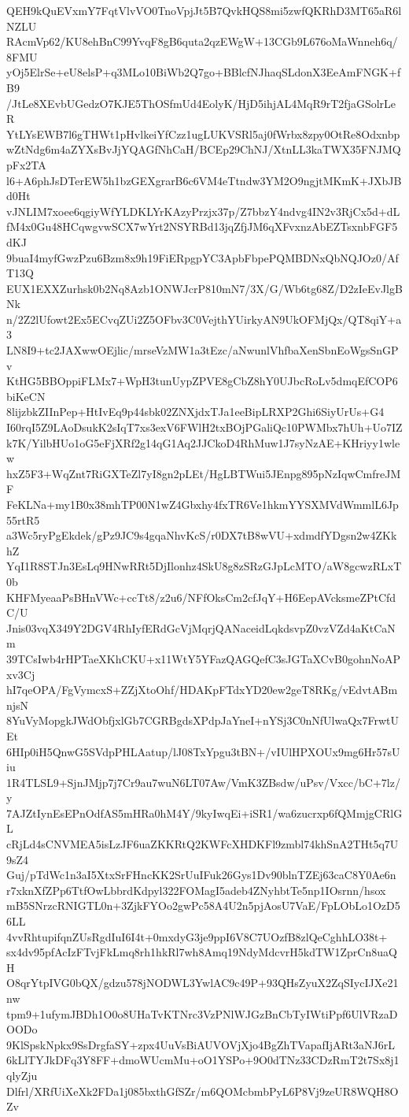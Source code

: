 QEH9kQuEVxmY7FqtVlvVO0TnoVpjJt5B7QvkHQS8mi5zwfQKRhD3MT65aR6lNZLU
RAcmVp62/KU8ehBnC99YvqF8gB6quta2qzEWgW+13CGb9L676oMaWnneh6q/8FMU
yOj5ElrSe+eU8elsP+q3MLo10BiWb2Q7go+BBlcfNJhaqSLdonX3EeAmFNGK+fB9
/JtLe8XEvbUGedzO7KJE5ThOSfmUd4EolyK/HjD5ihjAL4MqR9rT2fjaGSolrLeR
YtLYsEWB7l6gTHWt1pHvlkeiYfCzz1ugLUKVSRl5aj0fWrbx8zpy0OtRe8Odxnbp
wZtNdg6m4aZYXsBvJjYQAGfNhCaH/BCEp29ChNJ/XtnLL3kaTWX35FNJMQpFx2TA
l6+A6phJsDTerEW5h1bzGEXgrarB6c6VM4eTtndw3YM2O9ngjtMKmK+JXbJBd0Ht
vJNLIM7xoee6qgiyWfYLDKLYrKAzyPrzjx37p/Z7bbzY4ndvg4IN2v3RjCx5d+dL
fM4x0Gu48HCqwgvwSCX7wYrt2NSYRBd13jqZfjJM6qXFvxnzAbEZTsxnbFGF5dKJ
9buaI4myfGwzPzu6Bzm8x9h19FiERpgpYC3ApbFbpePQMBDNxQbNQJOz0/AfT13Q
EUX1EXXZurhsk0b2Nq8Azb1ONWJcrP810mN7/3X/G/Wb6tg68Z/D2zIeEvJlgBNk
n/2Z2lUfowt2Ex5ECvqZUi2Z5OFbv3C0VejthYUirkyAN9UkOFMjQx/QT8qiY+a3
LN8I9+tc2JAXwwOEjlic/mrseVzMW1a3tEzc/aNwunlVhfbaXenSbnEoWgsSnGPv
KtHG5BBOppiFLMx7+WpH3tunUypZPVE8gCbZ8hY0UJbcRoLv5dmqEfCOP6biKeCN
8lijzbkZIInPep+HtIvEq9p44sbk02ZNXjdxTJa1eeBipLRXP2Ghi6SiyUrUs+G4
I60rqI5Z9LAoDsukK2sIqT7xs3exV6FWlH2txBOjPGaliQc10PWMbx7hUh+Uo7IZ
k7K/YilbHUo1oG5eFjXRf2g14qG1Aq2JJCkoD4RhMuw1J7syNzAE+KHriyy1wlew
hxZ5F3+WqZnt7RiGXTeZl7yI8gn2pLEt/HgLBTWui5JEnpg895pNzIqwCmfreJMF
FeKLNa+my1B0x38mhTP00N1wZ4Gbxhy4fxTR6Ve1hkmYYSXMVdWmmlL6Jp55rtR5
a3Wc5ryPgEkdek/gPz9JC9s4gqaNhvKcS/r0DX7tB8wVU+xdmdfYDgsn2w4ZKkhZ
YqI1R8STJn3EsLq9HNwRRt5DjIlonhz4SkU8g8zSRzGJpLcMTO/aW8gcwzRLxT0b
KHFMyeaaPsBHnVWc+ccTt8/z2u6/NFfOksCm2cfJqY+H6EepAVcksmeZPtCfdC/U
Jnis03vqX349Y2DGV4RhIyfERdGcVjMqrjQANaceidLqkdsvpZ0vzVZd4aKtCaNm
39TCsIwb4rHPTaeXKhCKU+x11WtY5YFazQAGQefC3sJGTaXCvB0gohnNoAPxv3Cj
hI7qeOPA/FgVymcxS+ZZjXtoOhf/HDAKpFTdxYD20ew2geT8RKg/vEdvtABmnjsN
8YuVyMopgkJWdObfjxlGb7CGRBgdsXPdpJaYneI+nYSj3C0nNfUlwaQx7FrwtUEt
6HIp0iH5QnwG5SVdpPHLAatup/lJ08TxYpgu3tBN+/vIUlHPXOUx9mg6Hr57sUiu
1R4TLSL9+SjnJMjp7j7Cr9au7wuN6LT07Aw/VmK3ZBsdw/uPsv/Vxcc/bC+7lz/y
7AJZtIynEsEPnOdfAS5mHRa0hM4Y/9kyIwqEi+iSR1/wa6zucrxp6fQMmjgCRlGL
cRjLd4sCNVMEA5isLzJF6uaZKKRtQ2KWFcXHDKFl9zmbl74khSnA2THt5q7U9sZ4
Guj/pTdWc1n3aI5XtxSrFHncKK2SrUuIFuk26Gys1Dv90blnTZEj63caC8Y0Ae6n
r7xknXfZPp6TtfOwLbbrdKdpyl322FOMagI5adeb4ZNyhbtTe5np1IOsrnn/hsox
mB5SNrzcRNIGTL0n+3ZjkFYOo2gwPc58A4U2n5pjAosU7VaE/FpLObLo1OzD56LL
4vvRhtupifqnZUsRgdIuI6I4t+0mxdyG3je9ppI6V8C7UOzfB8zlQeCghhLO38t+
sx4dv95pfAcIzFTvjFkLmq8rh1hkRl7wh8Amq19NdyMdcvrH5kdTW1ZprCn8uaQH
O8qrYtpIVG0bQX/gdzu578jNODWL3YwlAC9c49P+93QHsZyuX2ZqSIycIJXe21nw
tpm9+1ufymJBDh1O0o8UHaTvKTNrc3VzPNlWJGzBnCbTyIWtiPpf6UlVRzaDOODo
9KlSpskNpkx9SsDrgfaSY+zpx4UuVsBiAUVOVjXjo4BgZhTVapafIjARt3aNJ6rL
6kLlTYJkDFq3Y8FF+dmoWUcmMu+oO1YSPo+9O0dTNz33CDzRmT2t7Sx8j1qlyZju
Dlfrl/XRfUiXeXk2FDa1j085bxthGfSZr/m6QOMcbmbPyL6P8Vj9zeUR8WQH8OZv
